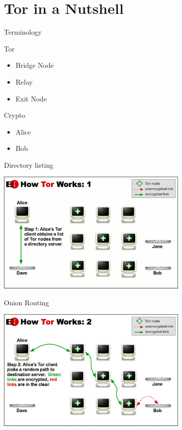\documentclass{beamer}
\begin{document}
\section{Tor in a Nutshell}
	\begin{frame}{Terminology}
		\begin{block}{Tor}
			\begin{itemize}
				\item Bridge Node
				\item Relay
				\item Exit Node
			\end{itemize}
		\end{block}

		\begin{block}{Crypto}
			\begin{itemize}
				\item Alice
				\item Bob
			\end{itemize}
		\end{block}
	\end{frame}
	\begin{frame}{Directory listing}
		\begin{center}
			\includegraphics[width=0.7\textwidth]{htw1.png}
		\end{center}
	\end{frame}
	\begin{frame}{Onion Routing}
		\begin{center}
			\includegraphics[width=0.7\textwidth]{htw2.png}
		\end{center}
	\end{frame}
\end{document}
